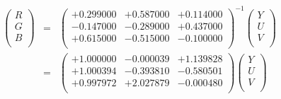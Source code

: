 \documentclass{article}
\begin{document}
\begin{eqnarray*} \left( \begin{array}{l} R \\ G \\ B \\ \end{array} \right) &=& \left( \begin{array}{lll} +0.299000 & +0.587000 & +0.114000 \\ -0.147000 & -0.289000 & +0.437000 \\ +0.615000 & -0.515000 & -0.100000 \\ \end{array} \right)^{-1} \left( \begin{array}{l} Y \\ U \\ V \\ \end{array} \right) \\ &=& \left( \begin{array}{lll} +1.000000 & -0.000039 & +1.139828 \\ +1.000394 & -0.393810 & -0.580501 \\ +0.997972 & +2.027879 & -0.000480 \\ \end{array} \right) \left( \begin{array}{l} Y \\ U \\ V \\ \end{array} \right) \\ \end{eqnarray*}
\pagebreak
\end{document}
